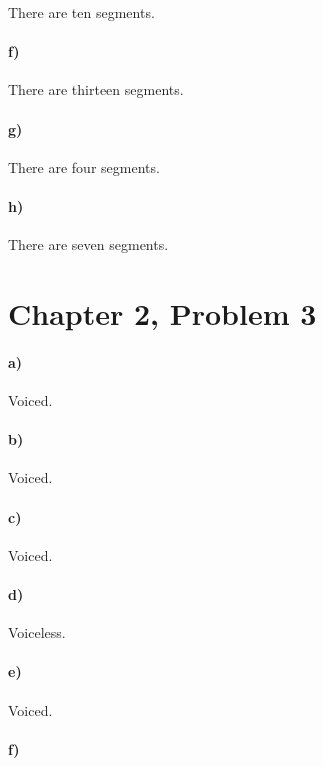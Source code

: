 \documentclass[12pt]{article}
\begin{document}
There are ten segments.

\paragraph{f)}

There are thirteen segments.

\paragraph{g)}

There are four segments.

\paragraph{h)}

There are seven segments.

\section*{Chapter 2, Problem 3}

\paragraph{a)}

Voiced.

\paragraph{b)}

Voiced.

\paragraph{c)}

Voiced.

\paragraph{d)}

Voiceless.

\paragraph{e)}

Voiced.

\paragraph{f)}
\end{document}
